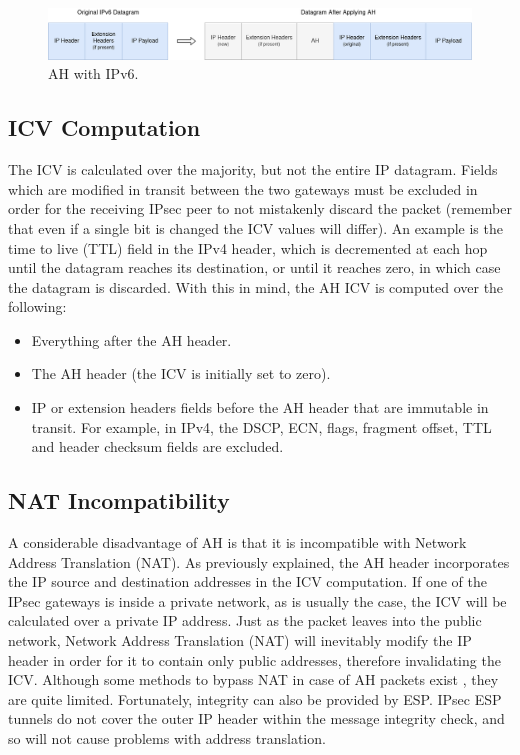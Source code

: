 \documentclass[a4paper,12pt]{report}
\begin{document}
		\begin{figure}[h]
			\includegraphics[width=\textwidth]{ah_tunnel_ipv6}
			\centering
			\caption{AH with IPv6.}
		\end{figure}
		
		\subsection{ICV Computation}
		The ICV is calculated over the majority, but not the entire IP datagram. Fields which are modified in transit between the two gateways must be excluded in order for the receiving IPsec peer to not mistakenly discard the packet (remember that even if a single bit is changed the ICV values will differ). An example is the time to live (TTL) field in the IPv4 header, which is decremented at each hop until the datagram reaches its destination, or until it reaches zero, in which case the datagram is discarded. With this in mind, the AH ICV is computed over the following:
		\begin{itemize}
			\item Everything after the AH header.
			\item The AH header (the ICV is initially set to zero).
			\item IP or extension headers fields before the AH header that are immutable in transit. For example, in IPv4, the DSCP, ECN, flags, fragment offset, TTL and header checksum fields are excluded.
		\end{itemize}
	
		\subsection{NAT Incompatibility}
			A considerable disadvantage of AH is that it is incompatible with Network Address Translation (NAT). As previously explained, the AH header incorporates the IP source and destination addresses in the ICV computation. If one of the IPsec gateways is inside a private network, as is usually the case, the ICV will be calculated over a private IP address. Just as the packet leaves into the public network, Network Address Translation (NAT) will inevitably modify the IP header in order for it to contain only public addresses, therefore invalidating the ICV. Although some methods to bypass NAT in case of AH packets exist \cite{rfc3715}, they are quite limited. Fortunately, integrity can also be provided by ESP. IPsec ESP tunnels do not cover the outer IP header within the message integrity check, and so will not cause problems with address translation.
			
\end{document}
